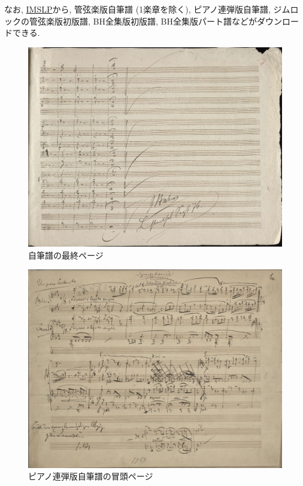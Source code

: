 なお, \href{http://imslp.org/wiki/Symphony_No.1,_Op.68_(Brahms,_Johannes)}{IMSLP}から,
管弦楽版自筆譜 (1楽章を除く), ピアノ連弾版自筆譜, ジムロックの管弦楽版初版譜, BH全集版初版譜, BH全集版パート譜などがダウンロードできる.

\begin{figure}[htbp]
	\centering
    \includegraphics[clip,width=12.0cm]{./figure/mov4-59.jpg}
	\caption{自筆譜の最終ページ}
    \label{fig: mov4-59}
\end{figure}

\begin{figure}[htbp]
	\centering
    \includegraphics[clip,width=12.0cm]{./figure/mov1(4H)-01.jpg}
	\caption{ピアノ連弾版自筆譜の冒頭ページ}
    \label{fig: mov1(4H)-01}
\end{figure}
